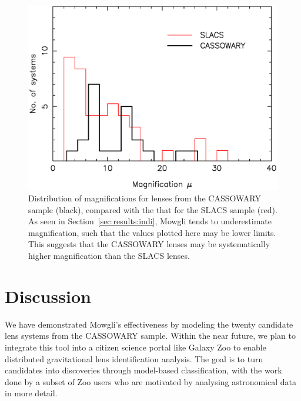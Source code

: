 \documentclass[iop]{emulateapj}
\def\theapplet{{\sc Mowgli}\xspace}
\begin{document}
\begin{figure}[!ht]
	\centering\includegraphics[width=\linewidth]{figs/muhist.ps}
  \caption{Distribution of magnifications for lenses from the CASSOWARY sample 
  (black), compared with the that for the SLACS sample (red). As seen in
  Section~\ref{sec:results:indi}, \theapplet tends to underestimate
  magnification, such that the values plotted here may  be lower limits. This
  suggests that the CASSOWARY lenses may be systematically higher magnification
  than the SLACS lenses.}
  \label{fig:mag_hist}
\end{figure}

 

\section{Discussion}
\label{sec:discuss}

We have  demonstrated \theapplet's  effectiveness by modeling the twenty
candidate lens systems from the CASSOWARY sample.  Within the near future, we
plan to integrate this tool into a citizen science portal like Galaxy Zoo to
enable distributed gravitational lens identification analysis. The goal is to
turn candidates into discoveries through model-based classification, with the
work done by  a subset of Zoo users who are motivated by analysing
astronomical data in more detail.
\end{document}
